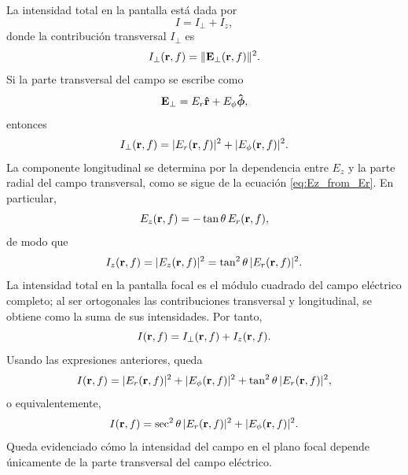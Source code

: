 La intensidad total en la pantalla está dada por
\begin{equation}
  I
  =
  I_\perp
  +
  I_z,
  \label{eq:Intensity_in_Focal_Plane_decomp}
\end{equation}
donde la contribución transversal $I_\perp$ es
\begin{equation}
    I_\perp(\vb{r}, f)
    =
    \|\vb{E}_\perp(\vb{r}, f)\|^2.
\end{equation}
Si la parte transversal del campo se escribe como
\begin{equation}
  \vb E_\perp
  =
  E_r \bm{\hat{\mathbf{r}}}
  +
  E_\phi \bm{\hat{\mathbf{\phi}}} ,
\end{equation}
entonces
\begin{equation}
  I_\perp(\vb r, f)
  =
  |E_r(\vb r, f)|^2
  +
  |E_\phi(\vb r, f)|^2 .
\end{equation}
La componente longitudinal se determina por la dependencia entre $E_z$ y la parte radial del campo transversal, como se sigue de la ecuación \eqref{eq:Ez_from_Er}. En particular,
\begin{equation}
  E_z(\vb r, f)
  =
  -\tan\theta\,
  E_r(\vb r, f),
\end{equation}
de modo que
\begin{equation}
  I_z(\vb r, f)
  =
  |E_z(\vb r, f)|^2
  =
  \tan^2\theta\,
  |E_r(\vb r, f)|^2 .
\end{equation}
La intensidad total en la pantalla focal es el módulo cuadrado del campo eléctrico completo; al ser ortogonales las contribuciones transversal y longitudinal, se obtiene como la suma de sus intensidades. Por tanto,
\begin{equation}
  I(\vb r, f)
  =
  I_\perp(\vb r, f)
  +
  I_z(\vb r, f).
  \label{eq:Intensity_in_Focal_Plane}
\end{equation}
Usando las expresiones anteriores, queda
\begin{equation}
  I(\vb r, f)
  =
  |E_r(\vb r, f)|^2
  +
  |E_\phi(\vb r, f)|^2
  +
  \tan^2\theta\,
  |E_r(\vb r, f)|^2 ,
\end{equation}
o equivalentemente,
\begin{equation}
  I(\vb r, f)
  =
  \sec^2\theta\,
  |E_r(\vb r, f)|^2
  +
  |E_\phi(\vb r, f)|^2 .
\end{equation}
Queda evidenciado cómo la intensidad del campo en el plano focal depende únicamente de la parte transversal del campo eléctrico.

